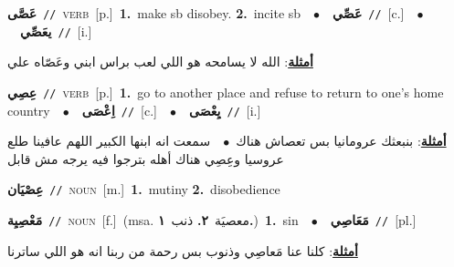 \documentclass[10pt,a4paper,twoside]{article} %
\begin{document}
\begin{multicols}{2}
{\setlength\topsep{0pt}\textbf{\foreignlanguage{arabic}{عَصَّى}}\ {\color{gray}\texttt{//}\color{black}}\ \textsc{verb}\ [p.]\ \textbf{1.}~make sb disobey.  \textbf{2.}~incite sb\ \ $\bullet$\ \ \setlength\topsep{0pt}\textbf{\foreignlanguage{arabic}{عَصِّي}}\ {\color{gray}\texttt{//}\color{black}}\ [c.]\ \ $\bullet$\ \ \setlength\topsep{0pt}\textbf{\foreignlanguage{arabic}{يعَصِّي}}\ {\color{gray}\texttt{//}\color{black}}\ [i.]\  \begin{flushright}\color{gray}\foreignlanguage{arabic}{\textbf{\underline{\foreignlanguage{arabic}{أمثلة}}}: الله لا يسامحه هو اللي لعب براس ابني وعَصّاه علي}\end{flushright}\color{black}} \vspace{2mm}

{\setlength\topsep{0pt}\textbf{\foreignlanguage{arabic}{عِصِي}}\ {\color{gray}\texttt{//}\color{black}}\ \textsc{verb}\ [p.]\ \textbf{1.}~go to another place and refuse to return to one's home country\ \ $\bullet$\ \ \setlength\topsep{0pt}\textbf{\foreignlanguage{arabic}{اِعْصَى}}\ {\color{gray}\texttt{//}\color{black}}\ [c.]\ \ $\bullet$\ \ \setlength\topsep{0pt}\textbf{\foreignlanguage{arabic}{يِعْصَى}}\ {\color{gray}\texttt{//}\color{black}}\ [i.]\  \begin{flushright}\color{gray}\foreignlanguage{arabic}{\textbf{\underline{\foreignlanguage{arabic}{أمثلة}}}: بنبعثك عرومانيا بس تعصاش هناك\ $\bullet$\ \  سمعت انه ابنها الكبير اللهم عافينا طلع عروسيا وعِصِي هناك أهله بترجوا فيه يرجه مش قابل}\end{flushright}\color{black}} \vspace{2mm}

{\setlength\topsep{0pt}\textbf{\foreignlanguage{arabic}{عِصْيَان}}\ {\color{gray}\texttt{//}\color{black}}\ \textsc{noun}\ [m.]\ \textbf{1.}~mutiny  \textbf{2.}~disobedience\ } \vspace{2mm}

{\setlength\topsep{0pt}\textbf{\foreignlanguage{arabic}{مَعْصِيِة}}\ {\color{gray}\texttt{//}\color{black}}\ \textsc{noun}\ [f.]\ \color{gray}(msa. \foreignlanguage{arabic}{معصيَة}~\foreignlanguage{arabic}{\textbf{٢.}}  \foreignlanguage{arabic}{ذنب}~\foreignlanguage{arabic}{\textbf{١.}})\color{black}\ \textbf{1.}~sin\ \ $\bullet$\ \ \setlength\topsep{0pt}\textbf{\foreignlanguage{arabic}{مَعَاصِي}}\ {\color{gray}\texttt{//}\color{black}}\ [pl.]\  \begin{flushright}\color{gray}\foreignlanguage{arabic}{\textbf{\underline{\foreignlanguage{arabic}{أمثلة}}}: كلنا عنا مَعاصِي وذنوب بس رحمة من ربنا انه هو اللي ساترنا}\end{flushright}\color{black}} \vspace{2mm}


\end{multicols}
\end{document}
